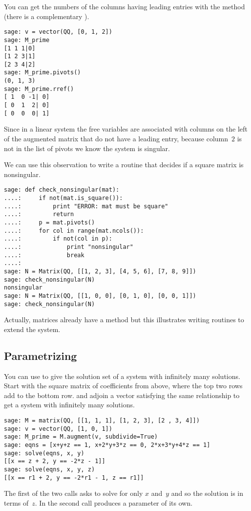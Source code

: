 You can get the numbers of the columns having leading entries with 
the  method
(there is a complementary ).
\begin{lstlisting}
sage: v = vector(QQ, [0, 1, 2])
sage: M_prime                  
[1 1 1|0]
[1 2 3|1]
[2 3 4|2]
sage: M_prime.pivots()         
(0, 1, 3)
sage: M_prime.rref()
[ 1  0 -1| 0]
[ 0  1  2| 0]
[ 0  0  0| 1]  
\end{lstlisting}
Since in a linear system the 
free variables are associated with columns on the left of the augmented 
matrix that do not have 
a leading entry, because column~$2$ is not in the list of pivots we know the
system is singular.

We can use this observation to write a routine that decides if a 
square matrix is nonsingular.
\begin{lstlisting}
sage: def check_nonsingular(mat):
....:     if not(mat.is_square()):
....:         print "ERROR: mat must be square"
....:         return
....:     p = mat.pivots()
....:     for col in range(mat.ncols()):
....:         if not(col in p):
....:             print "nonsingular"
....:             break
....:          
sage: N = Matrix(QQ, [[1, 2, 3], [4, 5, 6], [7, 8, 9]])
sage: check_nonsingular(N)                                
nonsingular
sage: N = Matrix(QQ, [[1, 0, 0], [0, 1, 0], [0, 0, 1]])
sage: check_nonsingular(N)                                   
\end{lstlisting}
Actually, \Sage{} matrices already have a method 
but this illustrates writing routines to extend the system.



\subsection{Parametrizing}
You can use  to give the solution set of a system
with infinitely many solutions.
Start with the square matrix of coefficients from above,
where the top two rows add to the bottom row.
and adjoin a vector satisfying the same relationship to get
a system with infinitely many solutions.
\begin{lstlisting}
sage: M = matrix(QQ, [[1, 1, 1], [1, 2, 3], [2 , 3, 4]])    
sage: v = vector(QQ, [1, 0, 1])                            
sage: M_prime = M.augment(v, subdivide=True)               
sage: eqns = [x+y+z == 1, x+2*y+3*z == 0, 2*x+3*y+4*z == 1]
sage: solve(eqns, x, y)   
[[x == z + 2, y == -2*z - 1]]  
sage: solve(eqns, x, y, z)                                 
[[x == r1 + 2, y == -2*r1 - 1, z == r1]]
\end{lstlisting}
The first of the two  calls asks \Sage{} 
to solve for only $x$ and~$y$ and so the solution is in terms of~$z$.
In the second call \Sage{} produces a parameter of its own.   




